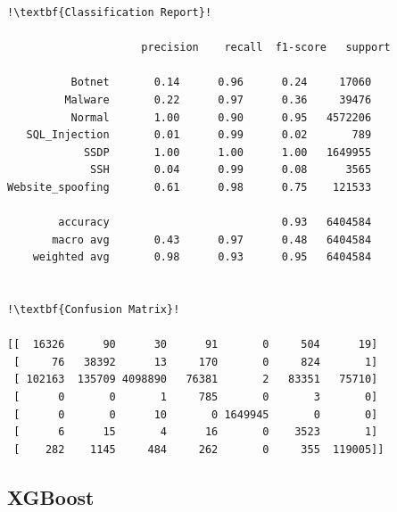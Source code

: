 \begin{appendices}
\begin{lstlisting}[escapechar=!]
!\textbf{Classification Report}!

                     precision    recall  f1-score   support

          Botnet       0.14      0.96      0.24     17060
         Malware       0.22      0.97      0.36     39476
          Normal       1.00      0.90      0.95   4572206
   SQL_Injection       0.01      0.99      0.02       789
            SSDP       1.00      1.00      1.00   1649955
             SSH       0.04      0.99      0.08      3565
Website_spoofing       0.61      0.98      0.75    121533
           
        accuracy                           0.93   6404584
       macro avg       0.43      0.97      0.48   6404584
    weighted avg       0.98      0.93      0.95   6404584
    
    
!\textbf{Confusion Matrix}!

[[  16326      90      30      91       0     504      19]
 [     76   38392      13     170       0     824       1]
 [ 102163  135709 4098890   76381       2   83351   75710]
 [      0       0       1     785       0       3       0]
 [      0       0      10       0 1649945       0       0]
 [      6      15       4      16       0    3523       1]
 [    282    1145     484     262       0     355  119005]]
\end{lstlisting}

\newpage
\subsection{XGBoost}


\end{appendices}
